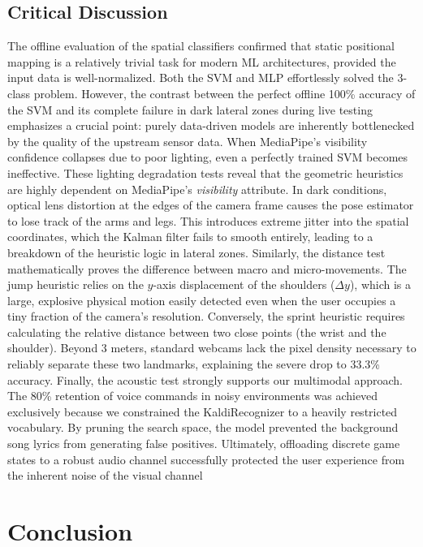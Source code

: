 \documentclass[10pt,twocolumn,a4paper]{article}
\begin{document}
    \subsection{Critical Discussion}
    The offline evaluation of the spatial classifiers confirmed that static positional mapping is a relatively trivial task for modern ML architectures, provided the input data is well-normalized. Both the SVM and MLP effortlessly solved the 3-class problem. However, the contrast between the perfect offline 100\% accuracy of the SVM and its complete failure in dark lateral zones during live testing emphasizes a crucial point: purely data-driven models are inherently bottlenecked by the quality of the upstream sensor data. When MediaPipe's visibility confidence collapses due to poor lighting, even a perfectly trained SVM becomes ineffective.
    These lighting degradation tests reveal that the geometric heuristics are highly dependent on MediaPipe's \textit{visibility} attribute. In dark conditions, optical lens distortion at the edges of the camera frame causes the pose estimator to lose track of the arms and legs. This introduces extreme jitter into the spatial coordinates, which the Kalman filter fails to smooth entirely, leading to a breakdown of the heuristic logic in lateral zones. 
    Similarly, the distance test mathematically proves the difference between macro and micro-movements. The jump heuristic relies on the $y$-axis displacement of the shoulders ($\Delta y$), which is a large, explosive physical motion easily detected even when the user occupies a tiny fraction of the camera's resolution. Conversely, the sprint heuristic requires calculating the relative distance between two close points (the wrist and the shoulder). Beyond 3 meters, standard webcams lack the pixel density necessary to reliably separate these two landmarks, explaining the severe drop to 33.3\% accuracy.
    Finally, the acoustic test strongly supports our multimodal approach. The 80\% retention of voice commands in noisy environments was achieved exclusively because we constrained the KaldiRecognizer to a heavily restricted vocabulary. By pruning the search space, the model prevented the background song lyrics from generating false positives. Ultimately, offloading discrete game states to a robust audio channel successfully protected the user experience from the inherent noise of the visual channel
	
	\section{Conclusion}
\end{document}
